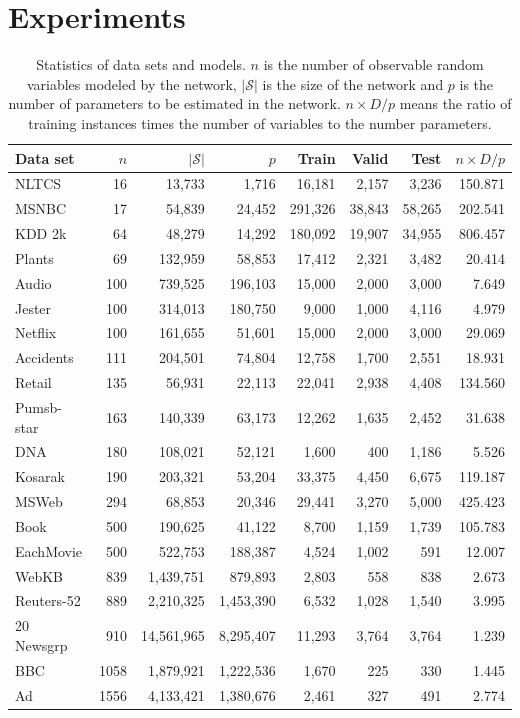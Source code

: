 \documentclass{article} %
\theoremstyle{definition}
\begin{document}
\section{Experiments}


\begin{table}[htb]
\centering
\caption{Statistics of data sets and models. $n$ is the number of observable random variables modeled by the network, $|\mathcal{S}|$ is the size of the network and $p$ is the number of parameters to be estimated in the network. $n \times D/p$ means the ratio of training instances times the number of variables to the number parameters.}
\label{table:statistics}
\begin{tabular}{|l||r|r|r|r|r|r|r|}\hline
\textbf{Data set} & $n$ & $|\mathcal{S}|$ & $p$ & Train & Valid & Test & $n\times D/p$ \\\hline
NLTCS & 16 & 13,733 & 1,716 & 16,181 & 2,157 & 3,236 & 150.871 \\
MSNBC & 17 & 54,839 & 24,452 & 291,326 & 38,843 & 58,265 & 202.541\\
KDD 2k & 64 & 48,279 & 14,292 & 180,092 & 19,907 & 34,955 & 806.457\\
Plants & 69 & 132,959 & 58,853 &17,412 & 2,321 & 3,482 & 20.414\\
Audio & 100 & 739,525 & 196,103 & 15,000 & 2,000 & 3,000 & 7.649\\
Jester & 100 & 314,013 & 180,750 & 9,000 & 1,000 & 4,116 & 4.979 \\
Netflix & 100 & 161,655 & 51,601 & 15,000 & 2,000 & 3,000 & 29.069\\
Accidents & 111 & 204,501 & 74,804 & 12,758 & 1,700 & 2,551 & 18.931\\
Retail & 135 & 56,931 & 22,113 & 22,041 & 2,938 & 4,408 & 134.560\\
Pumsb-star & 163 & 140,339 & 63,173 & 12,262 & 1,635 & 2,452 & 31.638\\
DNA & 180 & 108,021 & 52,121 & 1,600 & 400 & 1,186 & 5.526\\
Kosarak & 190 & 203,321 & 53,204 & 33,375 & 4,450 & 6,675 & 119.187\\
MSWeb & 294 & 68,853 & 20,346 & 29,441 & 3,270 & 5,000 & 425.423 \\
Book & 500 & 190,625 & 41,122 & 8,700 & 1,159 & 1,739 & 105.783\\
EachMovie & 500 & 522,753 & 188,387 & 4,524 & 1,002 & 591 & 12.007\\
WebKB & 839 & 1,439,751 & 879,893 & 2,803 & 558 & 838 & 2.673\\
Reuters-52 & 889 & 2,210,325 & 1,453,390 & 6,532 & 1,028 & 1,540 & 3.995\\
20 Newsgrp & 910 & 14,561,965 & 8,295,407 & 11,293 & 3,764 & 3,764 & 1.239 \\
BBC & 1058 & 1,879,921 & 1,222,536 & 1,670 & 225 & 330 & 1.445\\
Ad & 1556 & 4,133,421 & 1,380,676 & 2,461 & 327 & 491 & 2.774 \\\hline
\end{tabular}
\end{table}
\end{document}

